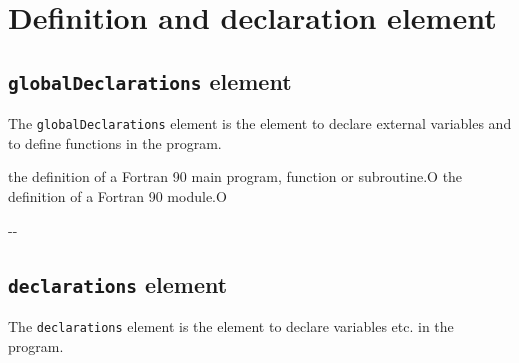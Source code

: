 \section{Definition and declaration element}

\subsection{ {\tt globalDeclarations} element}

The {\tt globalDeclarations} element is the element to declare external variables and to define functions in the program.


\begin{XcodeMLChildElements}
{the definition of a Fortran 90 main program, function or subroutine.}{O}
{the definition of a Fortran 90 module.}{O}
\end{XcodeMLChildElements}

\begin{XcodeMLAttributes}
\XcodeMLAttrDef{-}{-}
{-}{-}
\end{XcodeMLAttributes}


\subsection{ {\tt declarations} element}

The {\tt declarations} element is the element to declare variables etc. in the program.


